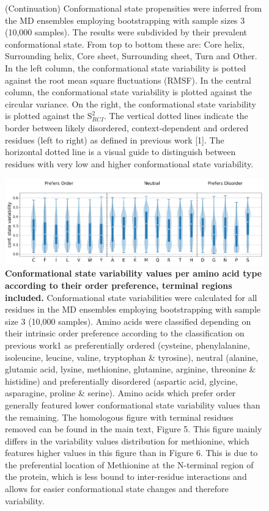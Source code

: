 \begin{figure}[H]
  \ContinuedFloat
  \caption[]{(Continuation) Conformational state propensities were inferred from the MD ensembles employing bootstrapping with sample sizes 3 (10,000 samples). The results were subdivided by their prevalent conformational state. From top to bottom these are: Core helix, Surrounding helix, Core sheet, Surrounding sheet, Turn and Other. In the left column, the conformational state variability is potted against the root mean square fluctuations (RMSF). In the central column, the conformational state variability is plotted against the circular variance. On the right, the conformational state variability is plotted against the $\text{S}^{2}_{RCI}$. The vertical dotted lines indicate the border between likely disordered, context-dependent and ordered residues (left to right) as defined in previous work [1]. The horizontal dotted line is a visual guide to distinguish between residues with very low and higher conformational state variability.}
\end{figure}

\begin{figure}[H]
    \centering
    \includegraphics[width=1\linewidth]{constava//sup_figs/supfig11.pdf}
    \caption{\textbf{Conformational state variability values per amino acid type according to their order preference, terminal regions included.} Conformational state variabilities were calculated for all residues in the MD ensembles employing bootstrapping with sample size 3 (10,000 samples). Amino acids were classified depending on their intrinsic order preference according to the classification on previous work1 as preferentially ordered (cysteine, phenylalanine, isoleucine, leucine, valine, tryptophan \& tyrosine), neutral (alanine, glutamic acid, lysine, methionine, glutamine, arginine, threonine \& histidine) and preferentially disordered (aspartic acid, glycine, asparagine, proline \& serine). Amino acids which prefer order generally featured lower conformational state variability values than the remaining. The homologous figure with terminal residues removed can be found in the main text, Figure 5. This figure mainly differs in the variability values distribution for methionine, which features higher values in this figure than in Figure 6. This is due to the preferential location of Methionine at the N-terminal region of the protein, which is less bound to inter-residue interactions and allows for easier conformational state changes and therefore variability.}
    \label{fig:sup_fig_constava:aa_order}
\end{figure}

